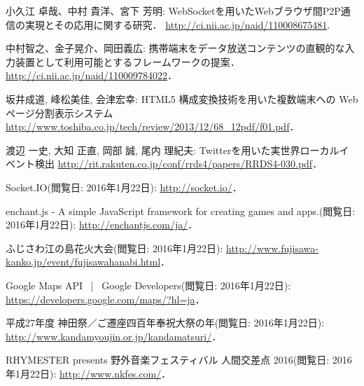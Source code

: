 \begin{thebibliography}{1}
        小久江 卓哉、中村 貴洋、宮下 芳明:
        WebSocketを用いたWebブラウザ間P2P通信の実現とその応用に関する研究．
        \url{http://ci.nii.ac.jp/naid/110008675481}.

        中村智之、金子晃介、岡田義広:
        携帯端末をデータ放送コンテンツの直観的な入力装置として利用可能とするフレームワークの提案．
        \url{http://ci.nii.ac.jp/naid/110009784022}．

        坂井成道, 峰松美佳, 会津宏幸:
        HTML5 構成変換技術を用いた複数端末への Web ページ分割表示システム
        \url{http://www.toshiba.co.jp/tech/review/2013/12/68_12pdf/f01.pdf}．

        渡辺 一史, 大知 正直, 岡部 誠, 尾内 理紀夫:
        Twitterを用いた実世界ローカルイベント検出
        \url{http://rit.rakuten.co.jp/conf/rrds4/papers/RRDS4-030.pdf}．

        Socket.IO(閲覧日: 2016年1月22日):
        \url{http://socket.io/}．

        enchant.js - A simple JavaScript framework for creating games and apps.(閲覧日: 2016年1月22日):
        \url{http://enchantjs.com/ja/}．

        ふじさわ江の島花火大会(閲覧日: 2016年1月22日):
        \url{http://www.fujisawa-kanko.jp/event/fujisawahanabi.html}．

        Google Maps API  |  Google Developers(閲覧日: 2016年1月22日):
        \url{https://developers.google.com/maps/?hl=ja}．

        平成27年度 神田祭／ご遷座四百年奉祝大祭の年(閲覧日: 2016年1月22日):
        \url{http://www.kandamyoujin.or.jp/kandamatsuri/}．

        RHYMESTER presents 野外音楽フェスティバル 人間交差点 2016(閲覧日: 2016年1月22日):
        \url{http://www.nkfes.com/}．

\end{thebibliography}
